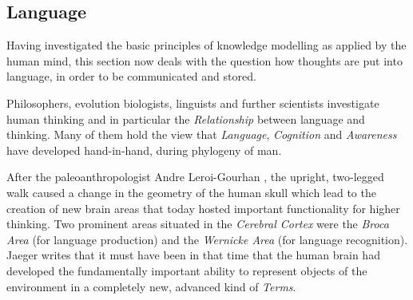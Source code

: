 %
%
%
%
%
%
%

\subsection{Language}
\label{language_heading}

Having investigated the basic principles of knowledge modelling as applied by
the human mind, this section now deals with the question how thoughts are put
into language, in order to be communicated and stored.

Philosophers, evolution biologists, linguists and further scientists investigate
human thinking and in particular the \emph{Relationship} between language and
thinking. Many of them hold the view that \emph{Language}, \emph{Cognition} and
\emph{Awareness} have developed hand-in-hand, during phylogeny of man.

After the paleoanthropologist Andre Leroi-Gourhan \cite{jaeger}, the upright,
two-legged walk caused a change in the geometry of the human skull which lead
to the creation of new brain areas that today hosted important functionality
for higher thinking. Two prominent areas situated in the \emph{Cerebral Cortex}
were the \emph{Broca Area} (for language production) and the \emph{Wernicke Area}
(for language recognition). Jaeger \cite{jaeger} writes that it must have been
in that time that the human brain had developed the fundamentally important
ability to represent objects of the environment in a completely new, advanced
kind of \emph{Terms}.

